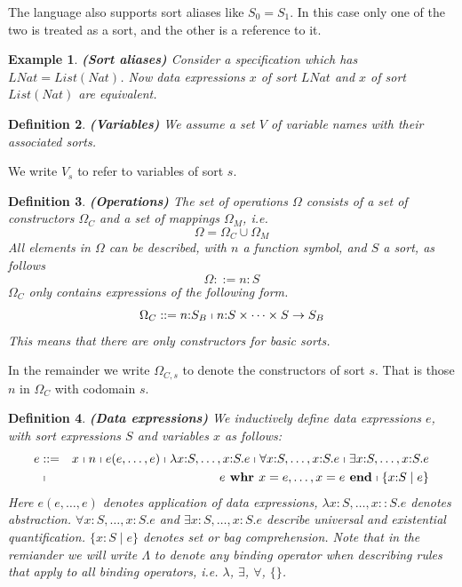 \documentclass[a4paper,11pt]{article}
\newcommand{\f}[1]{{\mathit{#1}}}
\newcommand{\List}{{\mathit{List}}}
\newtheorem{thdefinition}{Definition}[section]
\newenvironment{definition}
  {\begin{thdefinition}\em}
  {\end{thdefinition}}
\newtheorem{thexample}[thdefinition]{Example}
\newenvironment{example}
  {\begin{thexample}\em}
  {\end{thexample}}
\begin{document}
The language also supports sort aliases like $S_0 = S_1$. In this case only one of the two is treated as a sort, and the other is a reference to it.
\begin{example}\textbf{(Sort aliases)}
 Consider a specification which has $LNat = \List(Nat)$. Now data expressions $x$ of sort $\f{LNat}$ and $x$ of sort $\List(Nat)$ are equivalent.
\end{example}

\begin{definition}\textbf{(Variables)}
We assume a set $V$ of variable names with their associated sorts.
\end{definition}
We write $V_s$ to refer to variables of sort $s$.

\begin{definition}\textbf{(Operations)}
The set of operations $\Omega$ consists of a set of constructors $\Omega_C$ and a set of mappings $\Omega_M$, i.e.
\begin{equation*}
 \Omega = \Omega_C \cup \Omega_M
\end{equation*}
All elements in $\Omega$ can be described, with $n$ a function symbol, and $S$ a sort, as follows
\begin{equation*}
 \Omega ::= n {:} S
\end{equation*}
$\Omega_C$ only contains expressions of the following form.
\begin{equation*}
 \Omega_C ::= n {:} S_B \shortmid n {:} S \times \dots \times S \rightarrow S_B
\end{equation*}
This means that there are only constructors for basic sorts.
\end{definition}
In the remainder we write $\Omega_{C,s}$ to denote the constructors of sort $s$. That is those $n$ in $\Omega_C$ with codomain $s$.

\begin{definition}\textbf{(Data expressions)}
We inductively define data expressions $e$, with sort expressions $S$ and variables $x$ as follows:
\begin{eqnarray*}
 e & ::= & x \shortmid n \shortmid e(e, \dots, e) \shortmid \lambda x{:}S, \dots, x{:}S . e \shortmid \forall x{:}S, \dots, x{:}S . e \shortmid \exists x{:}S, \dots, x{:}S . e \\
   & \shortmid & e \textbf{ whr } x = e, \dots, x = e \textbf{ end} \shortmid \{x{:}S \mid e\}
\end{eqnarray*}
Here $e(e, \dots, e)$ denotes application of data expressions, $\lambda x{:}S, \dots, x{:}:S . e$ denotes abstraction. $\forall x{:}S, \dots, x{:}S . e$ and $\exists x{:}S, \dots, x{:}S . e$ describe universal and existential quantification. $\{x{:}S \mid e\}$ denotes set or bag comprehension. Note that in the remiander we will write $\Lambda$ to denote any binding operator when describing rules that apply to all binding operators, i.e. $\lambda$, $\exists$, $\forall$, $\{\}$.
\end{definition}
\end{document}
